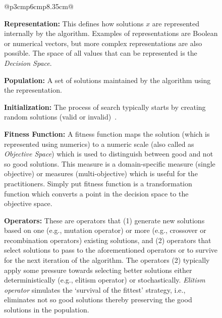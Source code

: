 \documentclass[sigconf,anonymous,review]{acmart}
\newcommand\TODO[1]{\textcolor{ScarletRed}{\textbf{\colorbox{yellow}{\small TODO:}} \emph{#1}}\xspace}
\begin{document}
\begin{figure}
{\begin{tabular}{@{}p{3cm}p{6cm}p{8.35cm}@{}}
{\begin{minipage}[b]{\linewidth}
                \textbf{Representation: } {This defines how solutions $x$ are represented internally by the algorithm.
                Examples of representations are Boolean or numerical vectors, but more complex representations are also possible. The space of all values that can be represented is the} \textit{Decision Space}.
                
                \textbf{Population: } A set of solutions maintained by the algorithm using the representation.
                
                \textbf{Initialization: } The process of search {typically} starts by creating random solutions (valid or invalid)~\cite{saber2017seeding, chen2017beyond, chen2017sampling, henard2015combining}.
                
                \textbf{Fitness Function: } A fitness function maps the solution (which is represented using numerics) to a numeric scale (also called as \textit{Objective Space}) which is used to distinguish between good and not so good solutions. This measure is a domain-specific measure (single objective) or measures (multi-objective) which is useful for the practitioners.
                Simply put fitness function is a transformation function which converts a point in the decision space to the objective space. 
                
                \textbf{Operators: } {These are operators that (1) generate new solutions based on one (e.g., mutation operator) or more (e.g., crossover or recombination operators) existing solutions, and (2) operators that select solutions to pass to the aforementioned operators or to survive for the next iteration of the algorithm. The operators (2) typically apply some pressure towards selecting better solutions either deterministically (e.g., elitism operator) or stochastically.} 
                \textit{Elitism operator} simulates the `survival of the fittest' strategy, i.e., eliminates not so good solutions thereby preserving the good solutions in the population. 
                

\end{minipage}}
\end{tabular}}
\end{figure}
\end{document}
